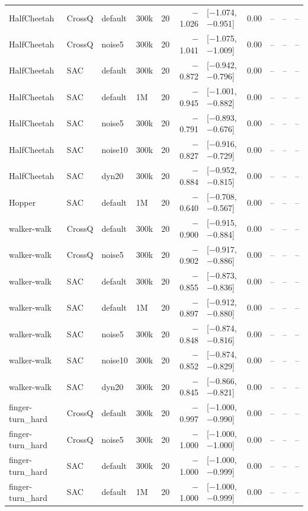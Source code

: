 \begin{longtable}{llllrrlrrrr}
HalfCheetah & CrossQ & default & 300k & 20 & $-$1.026 & [$-$1.074, $-$0.951] & 0.00 & -- & -- & -- \\
HalfCheetah & CrossQ & noise5 & 300k & 20 & $-$1.041 & [$-$1.075, $-$1.009] & 0.00 & -- & -- & -- \\
HalfCheetah & SAC & default & 300k & 20 & $-$0.872 & [$-$0.942, $-$0.796] & 0.00 & -- & -- & -- \\
HalfCheetah & SAC & default & 1M & 20 & $-$0.945 & [$-$1.001, $-$0.882] & 0.00 & -- & -- & -- \\
HalfCheetah & SAC & noise5 & 300k & 20 & $-$0.791 & [$-$0.893, $-$0.676] & 0.00 & -- & -- & -- \\
HalfCheetah & SAC & noise10 & 300k & 20 & $-$0.827 & [$-$0.916, $-$0.729] & 0.00 & -- & -- & -- \\
HalfCheetah & SAC & dyn20 & 300k & 20 & $-$0.884 & [$-$0.952, $-$0.815] & 0.00 & -- & -- & -- \\
Hopper & SAC & default & 1M & 20 & $-$0.640 & [$-$0.708, $-$0.567] & 0.00 & -- & -- & -- \\
walker-walk & CrossQ & default & 300k & 20 & $-$0.900 & [$-$0.915, $-$0.884] & 0.00 & -- & -- & -- \\
walker-walk & CrossQ & noise5 & 300k & 20 & $-$0.902 & [$-$0.917, $-$0.886] & 0.00 & -- & -- & -- \\
walker-walk & SAC & default & 300k & 20 & $-$0.855 & [$-$0.873, $-$0.836] & 0.00 & -- & -- & -- \\
walker-walk & SAC & default & 1M & 20 & $-$0.897 & [$-$0.912, $-$0.880] & 0.00 & -- & -- & -- \\
walker-walk & SAC & noise5 & 300k & 20 & $-$0.848 & [$-$0.874, $-$0.816] & 0.00 & -- & -- & -- \\
walker-walk & SAC & noise10 & 300k & 20 & $-$0.852 & [$-$0.874, $-$0.829] & 0.00 & -- & -- & -- \\
walker-walk & SAC & dyn20 & 300k & 20 & $-$0.845 & [$-$0.866, $-$0.821] & 0.00 & -- & -- & -- \\
finger-turn\_hard & CrossQ & default & 300k & 20 & $-$0.997 & [$-$1.000, $-$0.990] & 0.00 & -- & -- & -- \\
finger-turn\_hard & CrossQ & noise5 & 300k & 20 & $-$1.000 & [$-$1.000, $-$1.000] & 0.00 & -- & -- & -- \\
finger-turn\_hard & SAC & default & 300k & 20 & $-$1.000 & [$-$1.000, $-$0.999] & 0.00 & -- & -- & -- \\
finger-turn\_hard & SAC & default & 1M & 20 & $-$1.000 & [$-$1.000, $-$0.999] & 0.00 & -- & -- & -- \\

\end{longtable}
